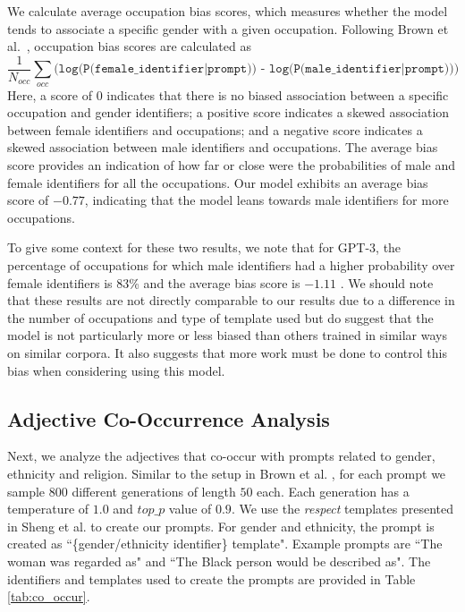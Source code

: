 \documentclass[11pt]{article}
\begin{document}
We calculate average occupation bias scores, which measures whether the model tends to associate a specific gender with a given occupation.
Following Brown et al.\ \cite{brown2020language}, occupation bias scores are calculated as
\begin{equation*}
\frac{1}{N_{occ}} \sum_{occ} (\texttt{log(P(female\_identifier|prompt)) - log(P(male\_identifier|prompt)))}
\end{equation*}
Here, a score of $0$ indicates that there is no biased association between a specific occupation and gender identifiers; a positive score indicates a skewed association between female identifiers and occupations; and a negative score indicates a skewed association between male identifiers and occupations.
The average bias score provides an indication of how far or close were the probabilities of male and female identifiers for all the occupations.
Our model exhibits an average bias score of $-0.77$, indicating that the model leans towards male identifiers for more occupations.

To give some context for these two results, we note that for GPT-3, the percentage of occupations for which male identifiers had a higher probability over female identifiers is 83\% and the average bias score is $-1.11$ \cite{brown2020language}.
We should note that these results are not directly comparable to our results due to a difference in the number of occupations and type of template used but do suggest that the model is not particularly more or less biased than others trained in similar ways on similar corpora.
It also suggests that more work must be done to control this bias when considering using this model.


\subsection{Adjective Co-Occurrence Analysis}
Next, we analyze the adjectives that co-occur with prompts related to gender, ethnicity and religion.
Similar to the setup in Brown et al. \cite{brown2020language}, for each prompt we sample $800$ different generations of length $50$ each.
Each generation has a temperature of $1.0$ and $top\_p$ value of $0.9$.
We use the \textit{respect} templates presented in Sheng et al. \cite{sheng-etal-2019-woman} to create our prompts.
For gender and ethnicity, the prompt is created as ``\{gender/ethnicity identifier\} template".
Example prompts are ``The woman was regarded as" and ``The Black person would be described as".
The identifiers and templates used to create the prompts are provided in Table \ref{tab:co_occur}.
\end{document}
